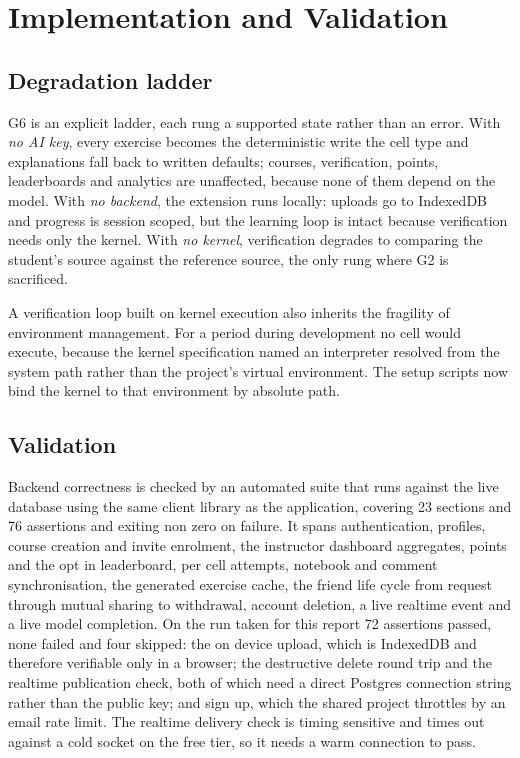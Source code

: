 \documentclass[manuscript]{acmart}
\begin{document}
\section{Implementation and Validation}

\subsection{Degradation ladder}

G6 is an explicit ladder, each rung a supported state rather than an error.
With \emph{no AI key}, every exercise becomes the deterministic write the cell
type and explanations fall back to written defaults; courses, verification,
points, leaderboards and analytics are unaffected, because none of them depend
on the model. With \emph{no backend}, the extension runs locally: uploads go to
IndexedDB and progress is session scoped, but the learning loop is intact
because verification needs only the kernel. With \emph{no kernel}, verification
degrades to comparing the student's source against the reference source, the
only rung where G2 is sacrificed.

A verification loop built on kernel execution also inherits the fragility of
environment management. For a period during development no cell would execute,
because the kernel specification named an interpreter resolved from the system
path rather than the project's virtual environment. The setup scripts now bind
the kernel to that environment by absolute path.

\subsection{Validation}

Backend correctness is checked by an automated suite that runs against the live
database using the same client library as the application, covering 23 sections
and 76 assertions and exiting non zero on failure. It spans authentication,
profiles, course creation and invite enrolment, the instructor dashboard
aggregates, points and the opt in leaderboard, per cell attempts, notebook and
comment synchronisation, the generated exercise cache, the friend life cycle
from request through mutual sharing to withdrawal, account deletion, a live
realtime event and a live model completion. On the run taken for this report 72
assertions passed, none failed and four skipped: the on device upload, which is
IndexedDB and therefore verifiable only in a browser; the destructive delete
round trip and the realtime publication check, both of which need a direct
Postgres connection string rather than the public key; and sign up, which the
shared project throttles by an email rate limit. The realtime delivery check is
timing sensitive and times out against a cold socket on the free tier, so it
needs a warm connection to pass.
\end{document}
